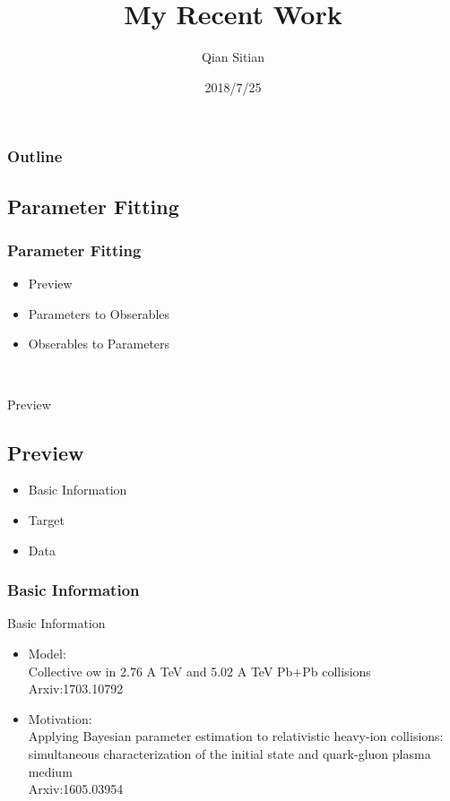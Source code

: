 \documentclass{beamer}
\title{My Recent Work}
\author{Qian Sitian}
\date{2018/7/25}
\begin{document}
\begin{frame}
    \titlepage
\end{frame}
\begin{frame}
    \frametitle{Outline}
    \tableofcontents
\end{frame}
\begin{frame}   
    \section{Parameter Fitting}
    \frametitle{Parameter Fitting}
    \begin{itemize}
        \item Preview
        \item Parameters to Obserables
        \item Obserables to Parameters
    \end{itemize}
\end{frame}\
\begin{frame}{Preview}
    \subsection{Preview}
    \begin{itemize}
        \item Basic Information
        \item Target
        \item Data
    \end{itemize}
\end{frame}
\begin{frame}
    \frametitle{Basic Information}
    
    Basic Information
    \begin{itemize}
        \item Model:\\Collective 
        ow in 2.76 A TeV and 5.02 A TeV Pb+Pb
        collisions
        \\
        Arxiv:1703.10792
        \item Motivation:\\Applying Bayesian parameter estimation to relativistic heavy-ion collisions:
        simultaneous characterization of the initial state and quark-gluon plasma medium
        \\
        Arxiv:1605.03954
    \end{itemize}
\end{frame}
\end{document}
